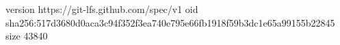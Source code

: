 version https://git-lfs.github.com/spec/v1
oid sha256:517d3680d0aca3c94f352f3ea740e795e66fb1918f59b3dc1e65a99155b22845
size 43840
